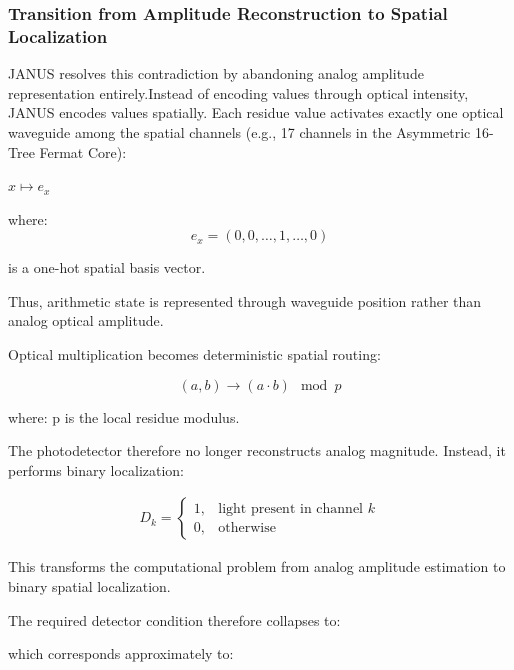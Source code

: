 \documentclass[journal]{IEEEtran}
\begin{document}
\subsubsection{\textbf{Transition from Amplitude Reconstruction to Spatial Localization}}
 
JANUS resolves this contradiction by abandoning analog amplitude representation entirely.Instead of encoding values through optical intensity, JANUS encodes values spatially. Each residue value activates exactly one optical waveguide among the spatial channels (e.g., 17 channels in the Asymmetric 16-Tree Fermat Core):

$x \mapsto e_x$

where:
\begin{equation}
e_x = (0, 0, \dots, 1, \dots, 0)
\end{equation}

is a one-hot spatial basis vector.

Thus, arithmetic state is represented through waveguide position rather than analog optical amplitude.

Optical multiplication becomes deterministic spatial routing:

\begin{equation}
(a, b) \rightarrow (a \cdot b) \mod p
\label{eq:rns_multiplication}
\end{equation}

where: p is the local residue modulus.

The photodetector therefore no longer reconstructs analog magnitude. Instead, it performs binary localization:

\begin{align}
D_k
=
\begin{cases}
1,
&
\text{light present in channel } k
\\
0,
&
\text{otherwise}
\end{cases}
\label{eq:binary_detection}
\end{align}

This transforms the computational problem from analog amplitude estimation to binary spatial localization.

The required detector condition therefore collapses to:

\begin{center}
\label{eq:binary_condition}
\end{center}

which corresponds approximately to:
\end{document}
